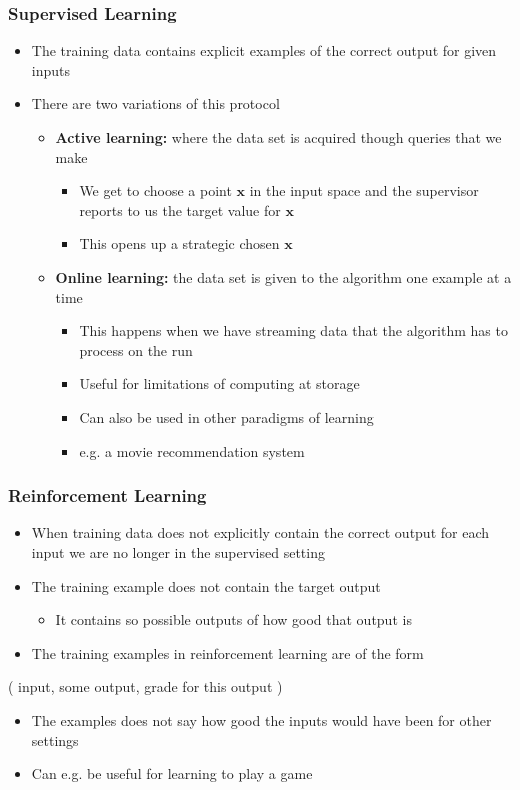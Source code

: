 \documentclass[11pt]{article}
\begin{document}
\subsubsection{Supervised Learning}
\label{sec:orgb76c0f3}
\begin{itemize}
\item The training data contains explicit examples of the correct output for given inputs
\item There are two variations of this protocol
\begin{itemize}
\item \textbf{Active learning:} where the data set is acquired though queries that we make
\begin{itemize}
\item We get to choose a point \(\pmb x\) in the input space and the supervisor reports to us the target value for \(\pmb x\)
\item This opens up a strategic chosen \(\pmb x\)
\end{itemize}
\item \textbf{Online learning:} the data set is given to the algorithm one example at a time
\begin{itemize}
\item This happens when we have streaming data that the algorithm has to process on the run
\item Useful for limitations of computing at storage
\item Can also be used in other paradigms of learning
\item e.g. a movie recommendation system
\end{itemize}
\end{itemize}
\end{itemize}

\subsubsection{Reinforcement Learning}
\label{sec:org6e8cf74}
\begin{itemize}
\item When training data does not explicitly contain the correct output for each input we are no longer in the supervised setting
\item The training example does not contain the target output
\begin{itemize}
\item It contains so possible outputs of how good that output is
\end{itemize}
\item The training examples in reinforcement learning are of the form
\end{itemize}
\begin{center}
( input, some output, grade for this output )
\end{center}
\begin{itemize}
\item The examples does not say how good the inputs would have been for other settings
\item Can e.g. be useful for learning to play a game
\end{itemize}
\end{document}
